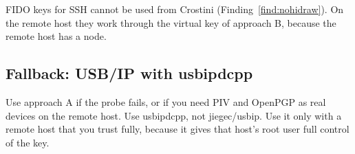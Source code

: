 FIDO keys for SSH cannot be used from Crostini (Finding~\ref{find:nohidraw}).
On the remote host they work through the virtual key of approach B, because
the remote host has a  node.

\subsection{Fallback: USB/IP with usbipdcpp}

Use approach A if the probe fails, or if you need PIV and OpenPGP as real
devices on the remote host. Use usbipdcpp, not jiegec/usbip. Use it only with
a remote host that you trust fully, because it gives that host's root user
full control of the key.
